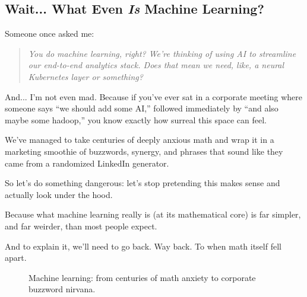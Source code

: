 \subsection{Wait... What Even \textit{Is} Machine Learning?}

Someone once asked me:

\begin{quote}
\textit{You do machine learning, right? We’re thinking of using AI to streamline our end-to-end analytics stack. Does that mean we need, like, a neural Kubernetes layer or something?}
\end{quote}

And... I'm not even mad. Because if you’ve ever sat in a corporate meeting where someone says “we should add some AI,” followed immediately by “and also maybe some hadoop,” you know exactly how surreal this space can feel.

We’ve managed to take centuries of deeply anxious math and wrap it in a marketing smoothie of buzzwords, synergy, and phrases that sound like they came from a randomized LinkedIn generator.

So let’s do something dangerous: let’s stop pretending this makes sense and actually look under the hood.

Because what machine learning really is (at its mathematical core) is far simpler, and far weirder, than most people expect.

And to explain it, we’ll need to go back. Way back. To when math itself fell apart.

\begin{figure}[H]
\centering
{}
\caption{Machine learning: from centuries of math anxiety to corporate buzzword nirvana.}
\end{figure}

